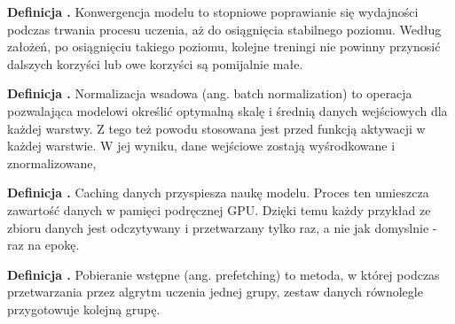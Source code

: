 \noindent
\textbf{Definicja .}
\incrementdefinitionIndex
Konwergencja modelu to stopniowe poprawianie się wydajności podczas trwania procesu uczenia,
aż do osiągnięcia stabilnego poziomu. Według założeń, po osiągnięciu takiego poziomu,
kolejne treningi nie powinny przynosić dalszych korzyści lub owe korzyści są pomijalnie małe.

\noindent
\textbf{Definicja .}
\incrementdefinitionIndex
Normalizacja wsadowa (ang. batch normalization) to operacja pozwalająca modelowi określić optymalną skalę
i średnią danych wejściowych dla każdej warstwy.
Z tego też powodu stosowana jest przed funkcją aktywacji w każdej warstwie.
W jej wyniku, dane wejściowe zostają wyśrodkowane i znormalizowane,

\noindent
\textbf{Definicja .}
\incrementdefinitionIndex
Caching danych przyspiesza naukę modelu. Proces ten umieszcza zawartość danych w pamięci podręcznej GPU.
Dzięki temu każdy przykład ze zbioru danych jest odczytywany i przetwarzany tylko raz, a nie jak domyslnie - raz na epokę.

\noindent
\textbf{Definicja .}
\incrementdefinitionIndex
Pobieranie wstępne (ang. prefetching) to metoda, w której podczas przetwarzania przez algrytm uczenia jednej grupy,
zestaw danych równolegle przygotowuje kolejną grupę.